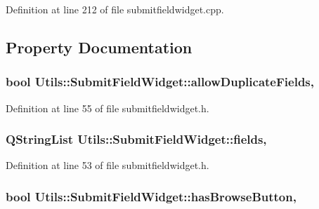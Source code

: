 Definition at line 212 of file submitfieldwidget.\-cpp.



\subsection{Property Documentation}
\hypertarget{class_utils_1_1_submit_field_widget_a7d0928a7bb510f65441ec97e3cc1d14d}{
\subsubsection[{allow\-Duplicate\-Fields}]{\setlength{\rightskip}{0pt plus 5cm}bool Utils\-::\-Submit\-Field\-Widget\-::allow\-Duplicate\-Fields\hspace{0.3cm}{\ttfamily [read]}, {\ttfamily [write]}}}\label{class_utils_1_1_submit_field_widget_a7d0928a7bb510f65441ec97e3cc1d14d}


Definition at line 55 of file submitfieldwidget.\-h.

\hypertarget{class_utils_1_1_submit_field_widget_a703b2271bfd9dce841ff482a1c787da8}{
\subsubsection[{fields}]{\setlength{\rightskip}{0pt plus 5cm}Q\-String\-List Utils\-::\-Submit\-Field\-Widget\-::fields\hspace{0.3cm}{\ttfamily [read]}, {\ttfamily [write]}}}\label{class_utils_1_1_submit_field_widget_a703b2271bfd9dce841ff482a1c787da8}


Definition at line 53 of file submitfieldwidget.\-h.

\hypertarget{class_utils_1_1_submit_field_widget_abf83b3fe4fc7040c43e27b77f77ac6a6}{
\subsubsection[{has\-Browse\-Button}]{\setlength{\rightskip}{0pt plus 5cm}bool Utils\-::\-Submit\-Field\-Widget\-::has\-Browse\-Button\hspace{0.3cm}{\ttfamily [read]}, {\ttfamily [write]}}}\label{class_utils_1_1_submit_field_widget_abf83b3fe4fc7040c43e27b77f77ac6a6}


